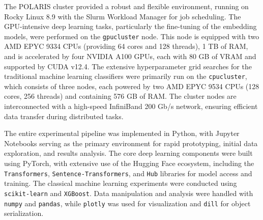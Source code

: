 The POLARIS cluster provided a robust and flexible environment, running on Rocky Linux 8.9 with the Slurm Workload Manager for job scheduling. The GPU-intensive deep learning tasks, particularly the fine-tuning of the embedding models, were performed on the \verb|gpucluster| node. This node is equipped with two AMD EPYC 9334 CPUs (providing 64 cores and 128 threads), 1 TB of RAM, and is accelerated by four NVIDIA A100 GPUs, each with 80 GB of VRAM and supported by CUDA v12.4. The extensive hyperparameter grid searches for the traditional machine learning classifiers were primarily run on the \verb|cpucluster|, which consists of three nodes, each powered by two AMD EPYC 9534 CPUs (128 cores, 256 threads) and containing 576 GB of RAM. The cluster nodes are interconnected with a high-speed InfiniBand 200 Gb/s network, ensuring efficient data transfer during distributed tasks.

The entire experimental pipeline was implemented in Python, with Jupyter Notebooks serving as the primary environment for rapid prototyping, initial data exploration, and results analysis. The core deep learning components were built using PyTorch, with extensive use of the Hugging Face ecosystem, including the \verb|Transformers|, \verb|Sentence-Transformers|, and \verb|Hub| libraries for model access and training. The classical machine learning experiments were conducted using \verb|scikit-learn| and \verb|XGBoost|. Data manipulation and analysis were handled with \verb|numpy| and \verb|pandas|, while \verb|plotly| was used for visualization and \verb|dill| for object serialization.

